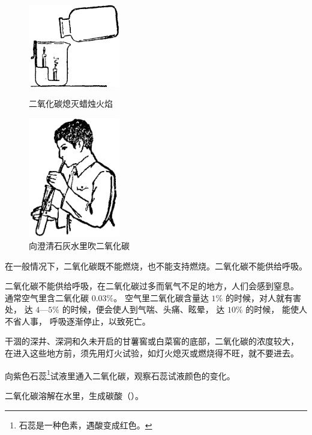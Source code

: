 \begin{figure}[htbp]
    \centering
    \begin{minipage}[b]{7cm}
        \centering
        \includegraphics[width=4cm]{../pic/czhx1-ch3-6}
        \caption{二氧化碳熄灭蜡烛火焰}\label{fig:3-6}
    \end{minipage}
    \qquad
    \begin{minipage}[b]{7cm}
        \centering
        \includegraphics[width=4cm]{../pic/czhx1-ch3-7}
        \caption{向澄清石灰水里吹二氧化碳}\label{fig:3-7}
    \end{minipage}
\end{figure}


在一般情况下，二氧化碳既不能燃烧，也不能支持燃烧。二氧化碳不能供给呼吸。

\begin{yuedu}
    二氧化碳不能供给呼吸，在二氧化碳过多而氧气不足的地方，人们会感到窒息。
    通常空气里含二氧化碳 $0.03\%$。
    空气里二氧化碳含量达 $1\%$ 的时候，对人就有害处，
    达 $4 \text{—} 5\%$ 的时候，便会使人到气喘、头痛、眩晕，
    达 $10\%$ 的时候， 能使人不省人事， 呼吸逐渐停止，以致死亡。
\end{yuedu}

干涸的深井、深洞和久未开启的甘薯窖或白菜窖的底部，二氧化碳的浓度较大，
在进入这些地方前，须先用灯火试验，如灯火熄灭或燃烧得不旺，就不要进去。

\begin{shiyan}
    向紫色石蕊\footnote{石蕊是一种色素，遇酸变成红色。}试液里通入二氧化碳，观察石蕊试液颜色的变化。
\end{shiyan}

二氧化碳溶解在水里，生成碳酸（）。
\begin{fangchengshi}
\end{fangchengshi}

